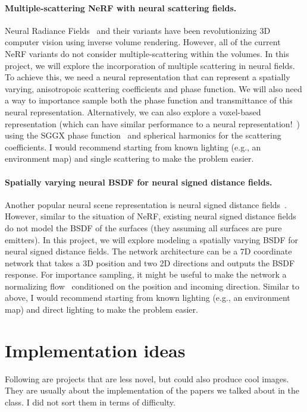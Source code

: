 \paragraph{Multiple-scattering NeRF with neural scattering fields.}
Neural Radiance Fields~\cite{Mildenhall:2021:NRS} and their variants have been revolutionizing 3D computer vision using inverse volume rendering.
However, all of the current NeRF variants do not consider multiple-scattering within the volumes.
In this project, we will explore the incorporation of multiple scattering in neural fields.
To achieve this, we need a neural representation that can represent a spatially varying, anisotropoic scattering coefficients and phase function.
We will also need a way to importance sample both the phase function and transmittance of this neural representation.
Alternatively, we can also explore a voxel-based representation (which can have similar performance to a neural representation!~\cite{KeilYu:2021:PRF}) using the SGGX phase function~\cite{Heitz:2015:SMD} and spherical harmonics for the scattering coefficients.
I would recommend starting from known lighting (e.g., an environment map) and single scattering to make the problem easier.

\paragraph{Spatially varying neural BSDF for neural signed distance fields.}
Another popular neural scene representation is neural signed distance fields~\cite{Bangaru:2022:DRN}.
However, similar to the situation of NeRF, existing neural signed distance fields do not model the BSDF of the surfaces (they assuming all surfaces are pure emitters).
In this project, we will explore modeling a spatially varying BSDF for neural signed distance fields.
The network architecture can be a 7D coordinate network that takes a 3D position and two 2D directions and outputs the BSDF response.
For importance sampling, it might be useful to make the network a normalizing flow~\cite{Muller:2019:NIS} conditioned on the position and incoming direction. Similar to above, I would recommend starting from known lighting (e.g., an environment map) and direct lighting to make the problem easier.

\section{Implementation ideas}

Following are projects that are less novel, but could also produce cool images. 
They are usually about the implementation of the papers we talked about in the class.
I did not sort them in terms of difficulty.

